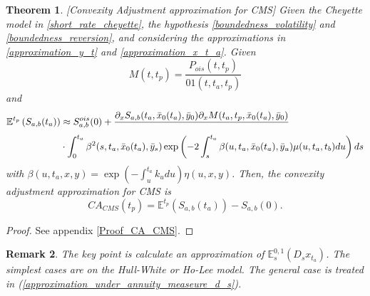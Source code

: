 \documentclass[a4paper,10pt]{article}
\newtheorem{theorem}{Theorem}[section]
\newtheorem{remark}[theorem]{Remark}
\newcommand{\1}{\mathbf{1}}
\begin{document}
\begin{theorem}\label{Th_CA_CMS}[Convexity Adjustment approximation for CMS]
Given the Cheyette model in \eqref{short_rate_cheyette}, the hypothesis \ref{boundedness_volatility} and \ref{boundedness_reversion}, and considering the approximations in \eqref{approximation_y_t} and \eqref{approximation_x_t_a}. Given
\begin{equation}
M(t,t_p)= \frac{P_{ois}(t,t_p)}{01(t,t_a,t_p)}
\end{equation}
and 
\begin{align}\label{cms_first_order_convexity}
\mathbb{E}^{t_p}\left(S_{a,b}(t_a)\right) &\approx  S^{ois}_{a,b}(0) + \frac{\partial_x S_{a,b}(t_a,\bar{x}_0(t_a), \bar{y}_0) \partial_x M(t_a,t_p,\bar{x}_0(t_a), \bar{y}_0)} \nonumber \\
&\cdot \int_{0}^{t_a}  \beta^2(s,t_a,\bar{x}_0(t_a),\bar{y}_s) \exp\left(-2\int_{s}^{t_a}\beta(u,t_a,\bar{x}_{0}(t_a),\bar{y}_u) \mu(u,t_a,t_b) du \right)ds 
\end{align}
with  $\beta(u,t_a,x,y) = \exp\left(-\int_{u}^{t_a}k_u du\right)\eta(u,x,y)$. Then, the convexity adjustment approximation for CMS is
\begin{equation}
CA_{CMS}(t_p) = \mathbb{E}^{t_p}\left(S_{a,b}(t_a)\right) - S_{a,b}(0).
\end{equation} 
\end{theorem}
\begin{proof}
See appendix \ref{Proof_CA_CMS}.
\end{proof}

\begin{remark}
The key point is calculate an approximation of $\mathbb{E}_s^{0,1}\left( D_s x_{t_a}\right)$. The simplest cases are on the Hull-White or Ho-Lee model. The general case is treated in (\ref{approximation_under_annuity_measeure_d_s}). 
\end{remark}
\end{document}
